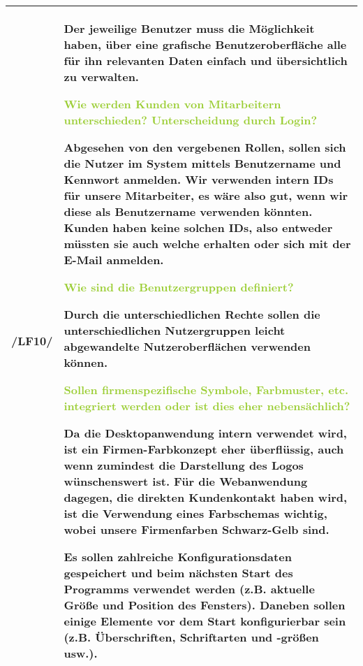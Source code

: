 \begin{tabular}{l | p{13cm}}
    \hline
    /LF10/ & Der jeweilige Benutzer muss die Möglichkeit haben, über eine grafische Benutzeroberfläche alle für ihn relevanten Daten einfach und übersichtlich zu verwalten. 

    \textcolor{YellowGreen}{Wie werden Kunden von Mitarbeitern unterschieden? Unterscheidung durch Login?}

    \textcolor{NavyBlue}{Abgesehen von den vergebenen Rollen, sollen sich die Nutzer im System mittels Benutzername und Kennwort anmelden. Wir verwenden intern IDs für unsere Mitarbeiter, es wäre also gut, wenn wir diese als Benutzername verwenden könnten. Kunden haben keine solchen IDs, also entweder müssten sie auch welche erhalten oder sich mit der E-Mail anmelden.}

    \textcolor{YellowGreen}{Wie sind die Benutzergruppen definiert?}

    \textcolor{NavyBlue}{Durch die unterschiedlichen Rechte sollen die unterschiedlichen Nutzergruppen leicht abgewandelte Nutzeroberflächen verwenden können.}

    \textcolor{YellowGreen}{Sollen firmenspezifische Symbole, Farbmuster, etc. integriert werden oder ist dies eher nebensächlich?}

    \textcolor{NavyBlue}{Da die Desktopanwendung intern verwendet wird, ist ein Firmen-Farbkonzept eher überflüssig, auch wenn zumindest die Darstellung des Logos wünschenswert ist. Für die Webanwendung dagegen, die direkten Kundenkontakt haben wird, ist die Verwendung eines Farbschemas wichtig, wobei unsere Firmenfarben Schwarz-Gelb sind.}

    Es sollen zahlreiche Konfigurationsdaten gespeichert und beim nächsten Start des Programms verwendet werden (z.B. aktuelle Größe und Position des Fensters). Daneben sollen einige Elemente vor dem Start konfigurierbar sein (z.B. Überschriften, Schriftarten und -größen usw.). \\
    \hline
    
\end{tabular}

